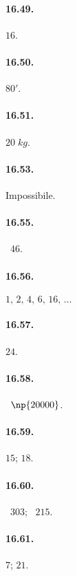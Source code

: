 \begin{multicols}{2}
\paragraph{16.49.}
$16$.

\paragraph{16.50.}
$80'$.

\paragraph{16.51.}
$20\;\unit{kg}$.

\paragraph{16.53.}
Impossibile.

\paragraph{16.55.}
\officialeuro~$46$.

\paragraph{16.56.}
$1\text{,~}2\text{,~}4\text{,~}6\text{,~}16\text{,~}\ldots$

\paragraph{16.57.}
$24$.

\paragraph{16.58.}
\officialeuro~$\np{20000}$.

\paragraph{16.59.}
$15$; $18$.

\paragraph{16.60.}
\officialeuro~$303$; \officialeuro~$215$.

\paragraph{16.61.}
$7$; $21$.


\end{multicols}
